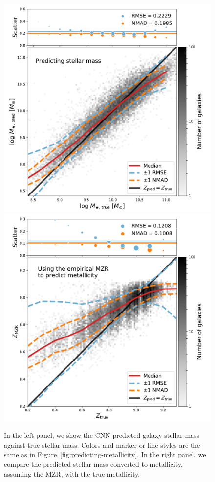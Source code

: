 \documentclass[fleqn,usenatbib]{mnras}
\begin{document}
\begin{figure}
	\includegraphics[width=\columnwidth]{05-a-prediction_mass.pdf}
	\includegraphics[width=\columnwidth]{05-b-prediction_mzr.pdf}
	\caption{\label{fig:mass-metallicity}
		In the left panel, we show the CNN predicted galaxy stellar mass against true stellar mass. Colors and marker or line styles are the same as in Figure~\ref{fig:predicting-metallicity}. In the right panel, we compare the predicted stellar mass converted to metallicity, assuming the \citealt{Tremonti2004} MZR, with the true metallicity.
		}
\end{figure}
\end{document}
